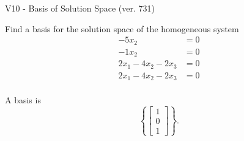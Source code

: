 \begin{exercise}
  \begin{exerciseTitle}V10 - Basis of Solution Space (ver. 731)\end{exerciseTitle}
  \begin{exerciseStatement}
    Find a basis for the solution space of the homogeneous system 
\begin{align*}
 -5 x_ 2 &= 0  \\ 
  -1 x_ 2 &= 0  \\ 
  2 x_ 1 -4 x_ 2 -2 x_ 3 &= 0  \\ 
  2 x_ 1 -4 x_ 2 -2 x_ 3 &= 0  \\ 
 \end{align*}


 
  \end{exerciseStatement}

  \begin{exerciseAnswer}
   A basis is   
\[\left\{\left[\begin{array}{c}
1 \\
0 \\
1
\end{array}\right]\right\}.\]

  


  \end{exerciseAnswer}
\end{exercise}